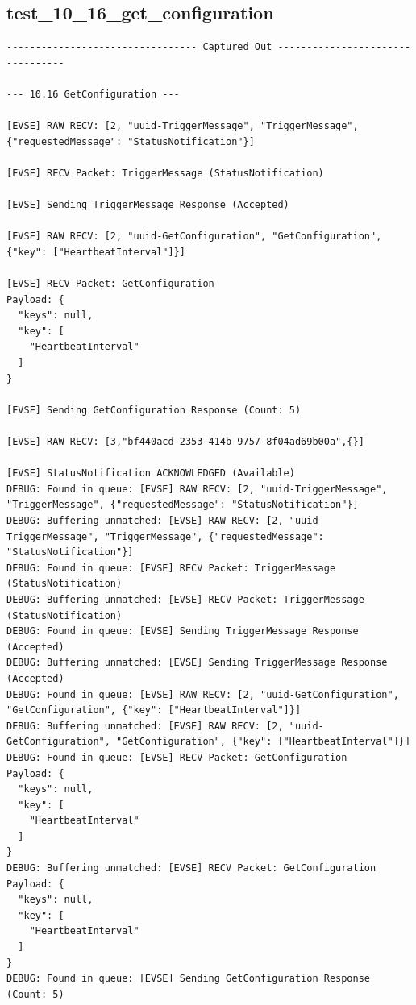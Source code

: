 \documentclass{article}
\begin{document}
\subsection*{test\_10\_16\_get\_configuration}
\begin{lstlisting}
--------------------------------- Captured Out ---------------------------------

--- 10.16 GetConfiguration ---

[EVSE] RAW RECV: [2, "uuid-TriggerMessage", "TriggerMessage", {"requestedMessage": "StatusNotification"}]

[EVSE] RECV Packet: TriggerMessage (StatusNotification)

[EVSE] Sending TriggerMessage Response (Accepted)

[EVSE] RAW RECV: [2, "uuid-GetConfiguration", "GetConfiguration", {"key": ["HeartbeatInterval"]}]

[EVSE] RECV Packet: GetConfiguration
Payload: {
  "keys": null,
  "key": [
    "HeartbeatInterval"
  ]
}

[EVSE] Sending GetConfiguration Response (Count: 5)

[EVSE] RAW RECV: [3,"bf440acd-2353-414b-9757-8f04ad69b00a",{}]

[EVSE] StatusNotification ACKNOWLEDGED (Available)
DEBUG: Found in queue: [EVSE] RAW RECV: [2, "uuid-TriggerMessage", "TriggerMessage", {"requestedMessage": "StatusNotification"}]
DEBUG: Buffering unmatched: [EVSE] RAW RECV: [2, "uuid-TriggerMessage", "TriggerMessage", {"requestedMessage": "StatusNotification"}]
DEBUG: Found in queue: [EVSE] RECV Packet: TriggerMessage (StatusNotification)
DEBUG: Buffering unmatched: [EVSE] RECV Packet: TriggerMessage (StatusNotification)
DEBUG: Found in queue: [EVSE] Sending TriggerMessage Response (Accepted)
DEBUG: Buffering unmatched: [EVSE] Sending TriggerMessage Response (Accepted)
DEBUG: Found in queue: [EVSE] RAW RECV: [2, "uuid-GetConfiguration", "GetConfiguration", {"key": ["HeartbeatInterval"]}]
DEBUG: Buffering unmatched: [EVSE] RAW RECV: [2, "uuid-GetConfiguration", "GetConfiguration", {"key": ["HeartbeatInterval"]}]
DEBUG: Found in queue: [EVSE] RECV Packet: GetConfiguration
Payload: {
  "keys": null,
  "key": [
    "HeartbeatInterval"
  ]
}
DEBUG: Buffering unmatched: [EVSE] RECV Packet: GetConfiguration
Payload: {
  "keys": null,
  "key": [
    "HeartbeatInterval"
  ]
}
DEBUG: Found in queue: [EVSE] Sending GetConfiguration Response (Count: 5)
\end{lstlisting}
\end{document}

